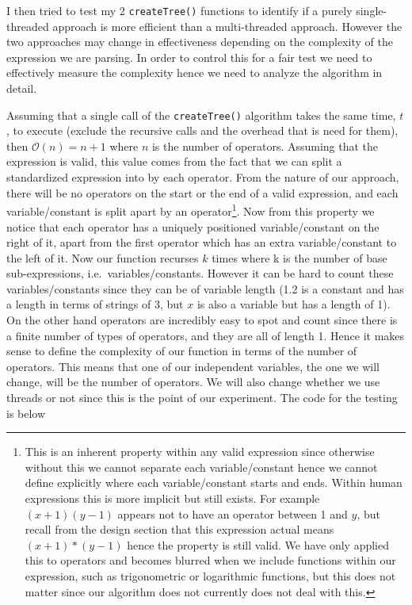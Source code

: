 \documentclass[../../../../../main.tex]{subfiles}
\begin{document}
\newpage\noindent
I then tried to test my 2 \texttt{createTree()} functions to identify if a purely single-threaded approach is more efficient than a multi-threaded approach. However the two approaches may change in effectiveness depending on the complexity of the expression we are parsing. In order to control this for a fair test we need to effectively measure the complexity hence we need to analyze the algorithm in detail.

Assuming that a single call of the \texttt{createTree()} algorithm takes the same time, $t$, to execute (exclude the recursive calls and the overhead that is need for them), then $\mathcal{O}(n) = n+1$ where $n$ is the number of operators. Assuming that the expression is valid, this value comes from the fact that we can split a standardized expression into by each operator. From the nature of our approach, there will be no operators on the start or the end of a valid expression, and each variable/constant is split apart by an operator\footnote{This is an inherent property within any valid expression since otherwise without this we cannot separate each variable/constant hence we cannot define explicitly where each variable/constant starts and ends. Within human expressions this is more implicit but still exists. For example $(x+1)(y-1)$ appears not to have an operator between 1 and $y$, but recall from the design section that this expression actual means $(x+1)*(y-1)$ hence the property is still valid. We have only applied this to operators and becomes blurred when we include functions within our expression, such as trigonometric or logarithmic functions, but this does not matter since our algorithm does not currently does not deal with this.}. 
Now from this property we notice that each operator has a uniquely positioned variable/constant on the right of it, apart from the first operator which has an extra variable/constant to the left of it. Now our function recurses $k$ times where k is the number of base sub-expressions, i.e.\ variables/constants. However it can be hard to count these variables/constants since they can be of variable length (1.2 is a constant and has a length in terms of strings of 3, but $x$ is also a variable but has a length of 1). On the other hand operators are incredibly easy to spot and count since there is a finite number of types of operators, and they are all of length 1. Hence it makes sense to define the complexity of our function in terms of the number of operators. This means that one of our independent variables, the one we will change, will be the number of operators. We will also change whether we use threads or not since this is the point of our experiment. The code for the testing is below
\end{document}
